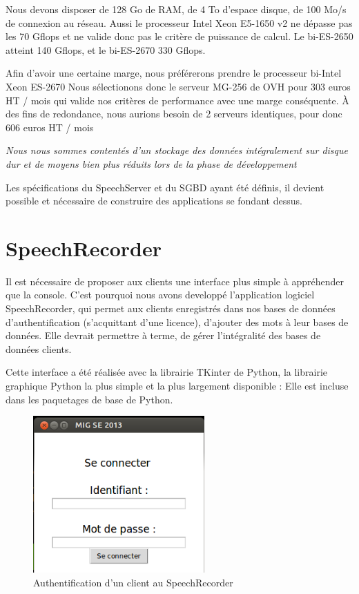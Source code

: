 \documentclass[a4paper,12pt]{report}
\begin{document}
Nous devons disposer de 128 Go de RAM, de 4 To d'espace disque, de 100 Mo/s de connexion au réseau.
Aussi le processeur Intel Xeon E5-1650 v2 ne dépasse pas les 70 Gflops et ne valide donc pas le critère de puissance de calcul.
Le bi-ES-2650 atteint 140 Gflops, et le bi-ES-2670 330 Gflops.

\smallskip{}

Afin d'avoir une certaine marge, nous préférerons prendre le processeur bi-Intel Xeon ES-2670
\smallskip{}
Nous sélectionons donc le serveur MG-256 de OVH pour 303 euros HT / mois qui valide nos critères de performance avec une marge conséquente.
\smallskip{}
À des fins de redondance, nous aurions besoin de 2 serveurs identiques, pour donc 606 euros HT / mois



\emph{Nous nous sommes contentés d'un stockage des données intégralement sur disque dur et de moyens bien plus réduits lors de la phase de développement}

\bigskip{}
\bigskip{}

Les spécifications du SpeechServer et du SGBD ayant été définis, il devient possible et nécessaire de construire des applications se fondant dessus.

\section{SpeechRecorder}

Il est nécessaire de proposer aux clients une interface plus simple à appréhender que la console. C'est pourquoi nous avons developpé l'application logiciel SpeechRecorder, qui permet aux clients enregistrés dans nos bases de données d'authentification (s'acquittant d'une licence), d'ajouter des mots à leur bases de données. Elle devrait permettre à terme, de gérer l'intégralité des bases de données clients.

\medskip{}

Cette interface a été réalisée avec la librairie TKinter de Python, la librairie graphique Python la plus simple et la plus largement disponible : Elle est incluse dans les paquetages de base de Python.

\begin{figure}[H]
	\begin{center}
	\includegraphics[height=6cm]{pics/speechrecorder-log.png} 
	\end{center}
	\caption{Authentification d'un client au SpeechRecorder}
\end{figure}
\end{document}
